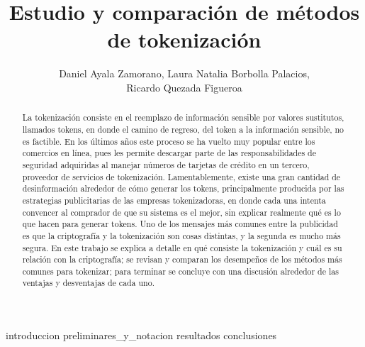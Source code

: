\documentclass[11pt]{llncs}
\begin{document}
  \title{Estudio y comparación de métodos de tokenización}
  \author{Daniel Ayala Zamorano,
     Laura Natalia Borbolla Palacios, \\
     Ricardo Quezada Figueroa}
  \maketitle

  \begin{abstract}
    La tokenización consiste en el reemplazo de información sensible por valores
    sustitutos, llamados tokens, en donde el camino de regreso, del  token a la
    información sensible, no es factible. En los últimos años este proceso se ha
    vuelto muy popular entre los comercios en línea, pues les permite descargar
    parte de las responsabilidades de seguridad adquiridas al manejar números de
    tarjetas de crédito en un tercero, proveedor de servicios de tokenización.
    Lamentablemente, existe una gran cantidad de desinformación alrededor de
    cómo generar los tokens, principalmente producida por las estrategias
    publicitarias de las empresas tokenizadoras, en donde cada una intenta
    convencer al comprador de que su sistema es el mejor, sin explicar realmente
    qué es lo que hacen para generar tokens. Uno de los mensajes más comunes
    entre la publicidad es que la criptografía y la tokenización son cosas
    distintas, y la segunda es mucho más segura. En este trabajo se explica a
    detalle en qué consiste la tokenización y cuál es su relación con la
    criptografía; se revisan y comparan los desempeños de los métodos más comunes
    para tokenizar; para terminar se concluye con una discusión alrededor de las
    ventajas y desventajas de cada uno.
  \end{abstract}


  {introduccion}
  {preliminares_y_notacion}
  {resultados}
  {conclusiones}
\end{document}
